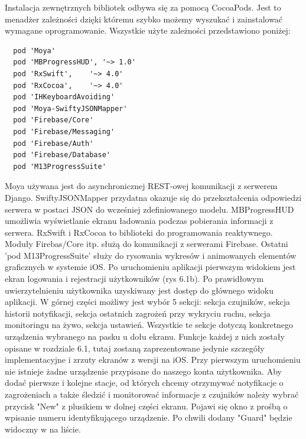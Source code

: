Instalacja zewnętrznych bibliotek odbywa się za pomocą CocoaPods. Jest to menadżer zależności dzięki któremu szybko możemy wyszukać i zainstalować wymagane oprogramowanie. Wszystkie użyte zależności przedstawiono poniżej: 
\begin{verbatim}
  pod 'Moya'
  pod 'MBProgressHUD', '~> 1.0'
  pod 'RxSwift',    '~> 4.0'
  pod 'RxCocoa',    '~> 4.0'
  pod 'IHKeyboardAvoiding'
  pod 'Moya-SwiftyJSONMapper'
  pod 'Firebase/Core'
  pod 'Firebase/Messaging'
  pod 'Firebase/Auth'
  pod 'Firebase/Database'
  pod 'M13ProgressSuite'
\end{verbatim}
Moya używana jest do asynchronicznej REST-owej komunikacji z serwerem Django. SwiftyJSONMapper przydatna okazuje się do przekształcenia odpowiedzi serwera w postaci JSON do wcześniej zdefiniowanego modelu. MBProgressHUD umożliwia wyświetlanie ekranu ładowania podczas pobierania informacji z serwera. RxSwift i RxCocoa to biblioteki do programowania reaktywnego. Moduły Firebas/Core itp. służą do komunikacji z serwerami Firebase. Ostatni 'pod M13ProgressSuite' służy do rysowania wykresów i animowanych elementów graficznych w systemie iOS.
Po uruchomieniu aplikacji pierwszym widokiem jest ekran logowania i rejestracji użytkowników (rys 6.1b). 
Po prawidłowym uwierzytelnieniu użytkownika uzyskiwany jest dostęp do głównego widoku aplikacji. W górnej części możliwy jest wybór 5 sekcji:
sekcja czujników, sekcja historii notyfikacji, sekcja ostatnich zagrożeń przy wykryciu ruchu, sekcja monitoringu na żywo, sekcja ustawień. Wszystkie te sekcje dotyczą konkretnego urządzenia wybranego na pasku u dołu ekranu. Funkcje każdej z nich zostały opisane w rozdziale 6.1, tutaj zostaną zaprezentowane jedynie szczegóły implementacyjne i zrzuty ekranów z wersji na iOS. Przy pierwszym uruchomieniu nie istnieje żadne urządzenie przypisane do naszego konta użytkownika. Aby dodać pierwsze i kolejne stacje, od których chcemy otrzymywać notyfikacje o zagrożeniach a także śledzić i monitorować informacje z czujników należy wybrać przycisk "New" z plusikiem w dolnej części ekranu. Pojawi się okno z prośbą o wpisanie numeru identyfikującego urządzenie. Po chwili dodany "Guard" będzie widoczny w na liście.


